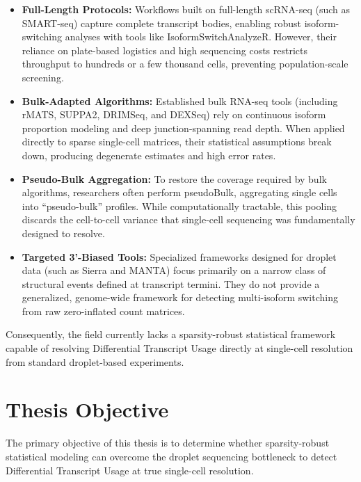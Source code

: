 \begin{itemize}
    \item \textbf{Full-Length Protocols:} Workflows built on full-length scRNA-seq (such as SMART-seq) capture complete transcript bodies, enabling robust isoform-switching analyses with tools like IsoformSwitchAnalyzeR. However, their reliance on plate-based logistics and high sequencing costs restricts throughput to hundreds or a few thousand cells, preventing population-scale screening.

    \item \textbf{Bulk-Adapted Algorithms:} Established bulk RNA-seq tools (including rMATS, SUPPA2, DRIMSeq, and DEXSeq) rely on continuous isoform proportion modeling and deep junction-spanning read depth. When applied directly to sparse single-cell matrices, their statistical assumptions break down, producing degenerate estimates and high error rates.

    \item \textbf{Pseudo-Bulk Aggregation:} To restore the coverage required by bulk algorithms, researchers often perform \gls{pseudoBulk}, aggregating single cells into ``pseudo-bulk'' profiles. While computationally tractable, this pooling discards the cell-to-cell variance that single-cell sequencing was fundamentally designed to resolve.
    
    \item \textbf{Targeted 3'-Biased Tools:} Specialized frameworks designed for droplet data (such as Sierra and MANTA) focus primarily on a narrow class of structural events defined at transcript termini. They do not provide a generalized, genome-wide framework for detecting multi-isoform switching from raw zero-inflated count matrices.
\end{itemize}

Consequently, the field currently lacks a sparsity-robust statistical framework capable of resolving Differential Transcript Usage directly at single-cell resolution from standard droplet-based experiments.

\section{Thesis Objective}
The primary objective of this thesis is to determine whether sparsity-robust statistical modeling can overcome the droplet sequencing bottleneck to detect Differential Transcript Usage at true single-cell resolution.

